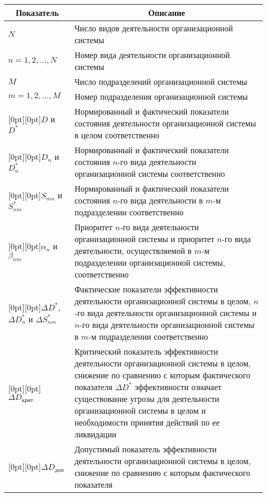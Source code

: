\begin{multicols}{2}
\begin{enumerate}[1.]
\begin{table*}[b]
\begin{center}
     \begin{tabular}{|l|p{130mm}|}
     \hline
\multicolumn{1}{|c|}{Показатель}&\multicolumn{1}{c|}{Описание}\\
\hline
$N$&Число видов деятельности организационной системы\\
\hline
$n = 1, 2, \ldots , N$&Номер вида деятельности организационной системы\\
\hline
$M$ &Число подразделений организационной системы\\
\hline
$m = 1, 2, \ldots , M$&Номер подразделения организационной системы\\
\hline
\multicolumn{1}{|l|}{\raisebox{-6pt}[0pt][0pt]{$D$ и $D^*$}}&Нормированный и фактический показатели состояния деятельности
организационной сис\-те\-мы в целом соответственно\\
\hline
\multicolumn{1}{|l|}{\raisebox{-6pt}[0pt][0pt]{$D_n$ и $D_n^*$}}&Нормированный и фактический показатели состояния $n$-го вида
деятельности организационной системы соответственно\\
\hline
\multicolumn{1}{|l|}{\raisebox{-6pt}[0pt][0pt]{$S_{mn}$ и $S_{nm}^*$}}&Нормированный и фактический показатели состояния $n$-го
вида деятельности в $m$-м подразделении соответственно\\
\hline
\multicolumn{1}{|l|}{\raisebox{-11pt}[0pt][0pt]{$\alpha_n$ и $\beta_{nm}$ }}&Приоритет $n$-го вида деятельности организационной
системы и приоритет $n$-го вида дея\-тельности, осуществляемой в $m$-м подразделении
организационной системы, соответст\-венно\\
\hline
\multicolumn{1}{|l|}{\raisebox{-11pt}[0pt][0pt]{$\Delta D^*$, $\Delta D_n^*$ и
$\Delta S^*_{nm}$}}&Фактические показатели эффективности
деятельности организационной системы в целом, $n$-го вида деятельности
организационной системы и $n$-го вида деятельности организационной системы в $m$-м
подразделении соответственно\\
\hline
\multicolumn{1}{|l|}{\raisebox{-16pt}[0pt][0pt]{$\Delta D_{\mathrm{крит}}$}}&Критический показатель эффективности деятельности организационной
системы в целом, снижение по сравнению с которым фактического показателя $\Delta D^*$
эффективности означает существование угрозы для деятельности организационной системы в целом и
необходимости принятия действий по ее ликвидации\\
\hline
\multicolumn{1}{|l|}{\raisebox{-16pt}[0pt][0pt]{$\Delta D_{\mathrm{доп}}$}}&Допустимый показатель эффективности деятельности организационной
системы в целом, снижение по сравнению с которым фактического показателя

\end{tabular}
\end{center}
\end{table*}
\end{enumerate}
\end{multicols}
